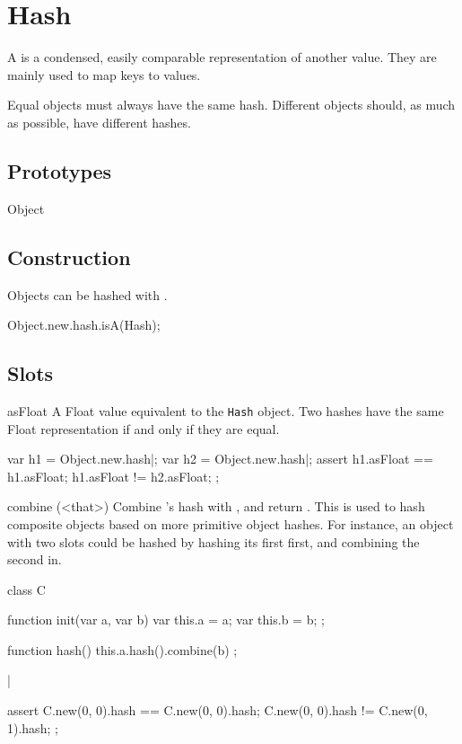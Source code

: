
\section{Hash}

A  is a condensed, easily comparable representation of another
value. They are mainly used to map  keys to values.

Equal objects must always have the same hash. Different objects should, as
much as possible, have different hashes.

\subsection{Prototypes}
\begin{refObjects}
\item[Object]
\end{refObjects}

\subsection{Construction}
Objects can be hashed with .
\begin{urbiassert}
Object.new.hash.isA(Hash);
\end{urbiassert}

\subsection{Slots}
\begin{urbiscriptapi}
\item[asFloat] A Float value equivalent to the \lstinline|Hash| object. Two
  hashes have the same Float representation if and only if they are equal.
\begin{urbiscript}
var h1 = Object.new.hash|;
var h2 = Object.new.hash|;
assert
{
  h1.asFloat == h1.asFloat;
  h1.asFloat != h2.asFloat;
};
\end{urbiscript}

\item[combine](<that>)%
  Combine \that's hash with \this, and return \this. This is used to hash
  composite objects based on more primitive object hashes. For instance, an
  object with two slots could be hashed by hashing its first first, and
  combining the second in.

\begin{urbiscript}
class C
{
  function init(var a, var b)
  {
    var this.a = a;
    var this.b = b;
  };

  function hash()
  {
    this.a.hash().combine(b)
  };
}|

assert
{
  C.new(0, 0).hash == C.new(0, 0).hash;
  C.new(0, 0).hash != C.new(0, 1).hash;
};
\end{urbiscript}
\end{urbiscriptapi}

